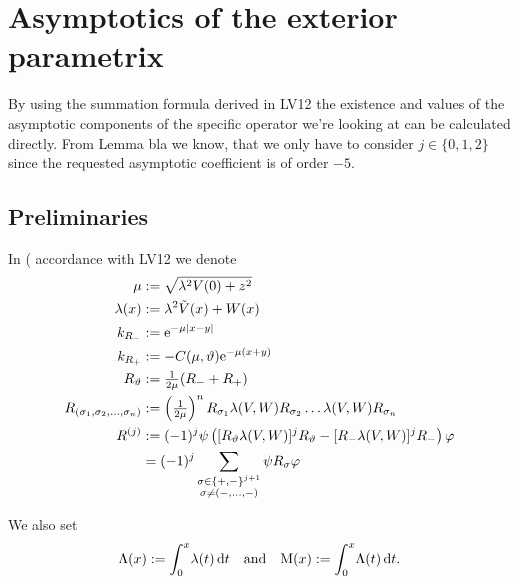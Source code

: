 \section{Asymptotics of the exterior parametrix}
By using the summation formula derived in LV12 the existence and values of the
asymptotic components of the specific operator we're looking at can be
calculated directly. From Lemma bla we know, that we only have to consider $j\in
\{0, 1, 2\}$ since the requested asymptotic coefficient is of order $-5$.

\subsection{Preliminaries}
In (%
accordance with LV12 we denote
\begin{align*}
    \mu &:= \sqrt{\lambda^2 V(0) + z^2} \\
    \lambda(x) &:= \lambda^2 \tilde V(x) + W(x) \\
       k_{R_-} &:= \Eto{-\mu\Abs{x-y}} \\
    k_{R_+} &:= -C(\mu,\theta)\Eto{-\mu(x+y)} \\
    R_\theta &:= \tfrac1{2\mu} (R_- + R_+) \\
    R_{(\sigma_1,\sigma_2,\ldots,\sigma_n)} &:= 
    \left(\tfrac1{2\mu}\right)^n R_{\sigma_1} \lambda(V,W) R_{\sigma_2} \dots
    \lambda(V,W) R_{\sigma_n} \\
    R^{(j)} &:= (-1)^j \psi \left( [R_\theta \lambda(V,W)]^j R_\theta -
    [R_-\lambda(V,W)]^j R_-\right) \phi \\
            &= (-1)^j
                \sum_{
                        \substack{
                          \sigma\in\{+,-\}^{j+1} \\
                         \sigma\neq(-,\ldots,-)
                         }
                        }
                     \psi R_\sigma
                \phi
\end{align*}

We also set
\begin{align}
    \Lambda(x) := \Integ[x]{0}{t}{\lambda(t)}\quad\text{and}\quad
    \mathrm M(x) := \Integ[x]{0}{t}{\Lambda(t)}.
\end{align}

